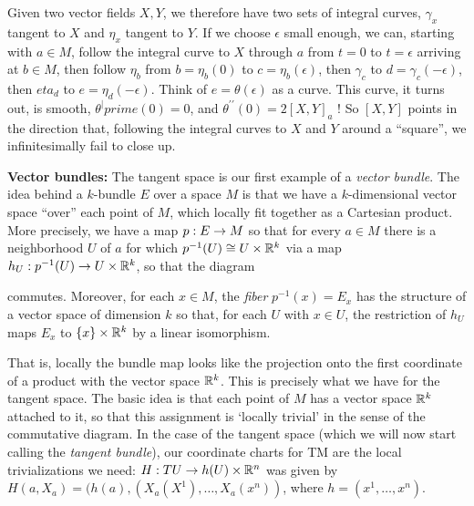 \ssk


Given two vector fields $X,Y$, we therefore have two sets of integral curves, $\gamma_x$ tangent to $X$ 
and $\eta_x$ tangent to $Y$. If we choose $\epsilon$ small enough, we can, starting with $a\in M$,
follow the integral curve to $X$ through $a$ from $t=0$ to $t=\epsilon$ arriving at $b\in M$, then 
follow $\eta_b$ from $b=\eta_b(0)$ to $c=\eta_b(\epsilon)$, then $\gamma_c$ to $d=\gamma_c(-\epsilon)$,
then $eta_d$ to $e=\eta_d(-\epsilon)$. Think of $e=\theta(\epsilon)$ as a curve. This curve, it
turns out, is smooth, $\theta^|prime(0)=0$, and $\theta^{\prime\prime}(0)=2[X,Y]_a$ ! 
So $[X,Y]$ points in the direction that, following the integral curves to $X$ and $Y$ around a 
``square'', we infinitesimally fail to close up.

\msk

{\bf Vector bundles:} 
The tangent space is our first example of a {\it vector bundle}. The idea behind a $k$-bundle $E$ over
a space $M$ is that we have a $k$-dimensional vector space ``over'' each point of $M$, which locally
fit together as a Cartesian product. More precisely, 
we have a map $p:E\rightarrow M$ so that for every $a\in M$ there is a neighborhood $U$ of $a$
for which $p^{-1}(U)\cong U\times {\Bbb R}^k$ via a map $h_U:p^{-1}(U)\rightarrow U\times {\Bbb R}^k$, so that
the diagram 

\ssk


\ssk

\noindent commutes. Moreover, for each $x\in M$, the {\it fiber} $p^{-1}(x)=E_x$ has the structure of
a vector space of dimension $k$ so that, for each $U$ with $x\in U$, the restriction
of $h_U$ maps $E_x$ to $\{x\}\times {\Bbb R}^k$ by a linear isomorphism.

That is, locally the bundle map looks like the projection
onto the first coordinate of a product with the vector space ${\Bbb R}^k$.
This is precisely what we have for the tangent space. The basic idea is
that each point of $M$ has a vector space ${\Bbb R}^k$ attached to it, so that this assignment is
`locally trivial' in the sense of the commutative diagram. In the case of the tangent space
(which we will now start calling the {\it tangent bundle}), our coordinate charts for TM are the 
local trivializations we need: $H:TU\rightarrow h(U)\times {\Bbb R}^n$ was given by
$H(a,X_a)=(h(a),(X_a(X^1),\ldots ,X_a(x^n))$, where $h=(x^1,\ldots ,x^n)$.

